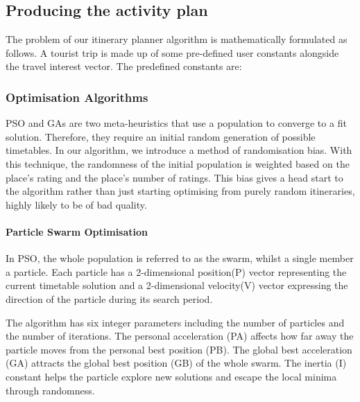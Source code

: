 

\subsection{Producing the activity plan}

The problem of our itinerary planner algorithm
is mathematically formulated as follows. A tourist trip is made up
of some pre-defined user constants alongside the travel interest
vector. The predefined constants are:
\\


%

\subsubsection{Optimisation Algorithms}

PSO and GAs are two meta-heuristics that use a population
to converge to a fit solution. Therefore, they require
an initial random generation of possible timetables. In
our algorithm, we introduce a method of randomisation
bias. With this technique, the randomness of the initial
population is weighted based on the place's rating and 
the place's number of ratings. This bias gives a 
head start to the algorithm rather than just starting 
optimising from purely random itineraries, highly likely 
to be of bad quality.

%


\paragraph{Particle Swarm Optimisation}

In PSO, the whole population is referred to as the
swarm, whilst a single member a particle. Each
particle has a 2-dimensional position(P) vector
representing the current timetable solution and a
2-dimensional velocity(V) vector expressing the direction
of the particle during its search period. 

The algorithm has six integer parameters including the
number of particles and the number of iterations. The
personal acceleration (PA) affects how far away the
particle moves from the personal best position (PB). 
The global best acceleration (GA) attracts the global
best position (GB) of the whole swarm. 
The inertia (I) constant helps the particle
explore new solutions and escape the local minima
through randomness. 

